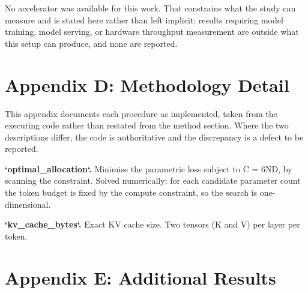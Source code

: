 \documentclass[10pt,twocolumn,letterpaper]{article}
\begin{document}
No accelerator was available for this work. That constrains what the study can measure and is stated here rather than left implicit: results requiring model training, model serving, or hardware throughput measurement are outside what this setup can produce, and none are reported.




\section{Appendix D: Methodology Detail}


This appendix documents each procedure as implemented, taken from the executing code rather than restated from the method section. Where the two descriptions differ, the code is authoritative and the discrepancy is a defect to be reported.

\textbf{`optimal\_allocation`.} Minimise the parametric loss subject to C = 6ND, by scanning the constraint. Solved numerically: for each candidate parameter count the token budget is fixed by the compute constraint, so the search is one-dimensional.

\textbf{`kv\_cache\_bytes`.} Exact KV cache size. Two tensors (K and V) per layer per token.




\section{Appendix E: Additional Results}
\end{document}
